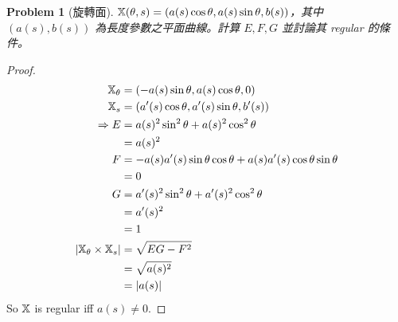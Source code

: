 \documentclass[10pt,a4paper]{article}
\newcounter{theProblemCounter}
\newtheorem{problem}[theProblemCounter]{Problem}
\begin{document}
\setcounter{theProblemCounter}{1}
\begin{problem}[旋轉面]
$\mathbb{X}(\theta, s)=(a(s)\cos\theta, a(s)\sin\theta, b(s))$，其中 $(a(s), b(s))$ 為長度參數之平面曲線。計算 $E, F, G$ 並討論其 regular 的條件。
\end{problem}
\begin{proof}
\begin{align*}
\mathbb{X}_{\theta}&=(-a(s)\sin\theta, a(s)\cos\theta,0)\\
\mathbb{X}_{s}&=(a'(s)\cos\theta, a'(s)\sin\theta, b'(s))\\
\Rightarrow E&=a(s)^2\sin^2\theta+a(s)^2\cos^2\theta\\
&=a(s)^2\\
F&=-a(s)a'(s)\sin\theta\cos\theta+a(s)a'(s)\cos\theta\sin\theta\\
&=0\\
G&=a'(s)^2\sin^2\theta+a'(s)^2\cos^2\theta\\
&=a'(s)^2\\
&=1\\
\left|\mathbb{X}_{\theta}\times\mathbb{X}_{s}\right|&=\sqrt{EG-F^2}\\
&=\sqrt{a(s)^2}\\
&=\left|a(s)\right|\\
\end{align*}
So $\mathbb{X}$ is regular iff $a(s)\neq 0$.
\end{proof}
\end{document}
